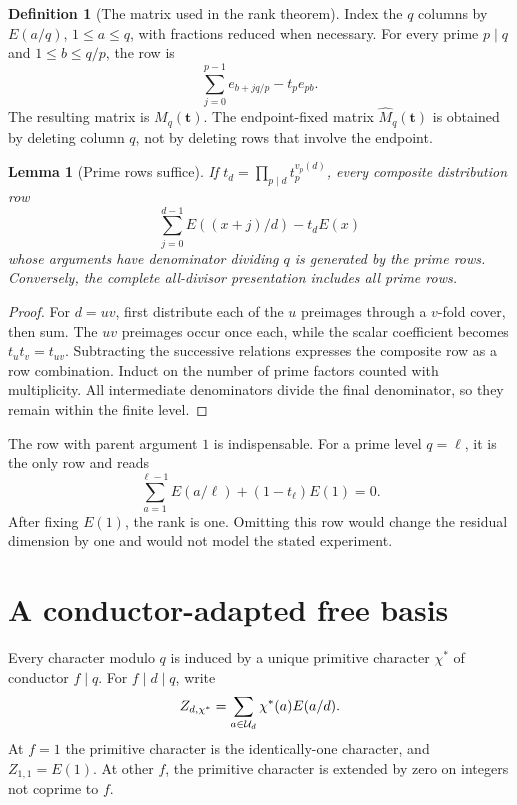 \documentclass[11pt]{article}
\numberwithin{equation}{section}
\newtheorem{lemma}[theorem]{Lemma}
\theoremstyle{definition}\newtheorem{definition}[theorem]{Definition}
\theoremstyle{remark}\newtheorem{remark}[theorem]{Remark}
\newcommand{\ch}{\chi^*}
\begin{document}
\begin{definition}[The matrix used in the rank theorem]\label{def:matrix}
Index the $q$ columns by $E(a/q)$, $1\le a\le q$, with fractions reduced
when necessary. For every prime $p\mid q$ and $1\le b\le q/p$, the row is
\begin{equation}\label{eq:matrixrow}
\sum_{j=0}^{p-1}e_{b+jq/p}-t_p e_{pb}.
\end{equation}
The resulting matrix is $M_q(\mathbf t)$. The endpoint-fixed matrix
$\widehat M_q(\mathbf t)$ is obtained by deleting column $q$, not by
deleting rows that involve the endpoint.
\end{definition}

\begin{lemma}[Prime rows suffice]\label{lem:prime}
If $t_d=\prod_{p\mid d}t_p^{v_p(d)}$, every composite distribution row
\[
\sum_{j=0}^{d-1}E((x+j)/d)-t_dE(x)
\]
whose arguments have denominator dividing $q$ is generated by the prime
rows. Conversely, the complete all-divisor presentation includes all prime
rows.
\end{lemma}
\begin{proof}
For $d=uv$, first distribute each of the $u$ preimages through a $v$-fold
cover, then sum. The $uv$ preimages occur once each, while the scalar
coefficient becomes $t_ut_v=t_{uv}$. Subtracting the successive relations
expresses the composite row as a row combination. Induct on the number of
prime factors counted with multiplicity. All intermediate denominators
divide the final denominator, so they remain within the finite level.
\end{proof}

The row with parent argument $1$ is indispensable. For a prime level
$q=\ell$, it is the only row and reads
\begin{equation}\label{eq:primelevel}
\sum_{a=1}^{\ell-1}E(a/\ell)+(1-t_\ell)E(1)=0.
\end{equation}
After fixing $E(1)$, the rank is one. Omitting this row would change the
residual dimension by one and would not model the stated experiment.

\section{A conductor-adapted free basis}

Every character modulo $q$ is induced by a unique primitive character
$\ch$ of conductor $f\mid q$. For $f\mid d\mid q$, write
\begin{equation}\label{eq:Z}
Z_{d,\ch}=\sum_{a\in\U_d}\ch(a)E(a/d).
\end{equation}
At $f=1$ the primitive character is the identically-one character, and
$Z_{1,1}=E(1)$. At other $f$, the primitive character is extended by zero
on integers not coprime to $f$.
\end{document}

